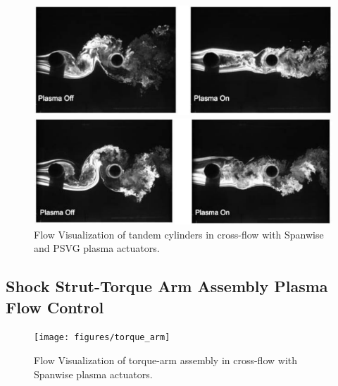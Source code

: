 \begin{figure}
	\begin{center}
		\centerline{\includegraphics[scale=1.0]{figures/tandem_span}}
		\centerline{\includegraphics[scale=1.0]{figures/tandem_psvg}}
		\caption{Flow Visualization of tandem cylinders in cross-flow with Spanwise and PSVG plasma actuators.}
		\label{fig:cyl2}
	\end{center}
\end{figure}

\subsection{Shock Strut-Torque Arm Assembly Plasma Flow Control}

\begin{figure}
	\begin{center}
		\centerline{\texttt{[image: figures/torque\_arm]}}
		\caption{Flow Visualization of torque-arm assembly in cross-flow with Spanwise plasma actuators.}
		\label{fig:cyl2}
	\end{center}
\end{figure}


